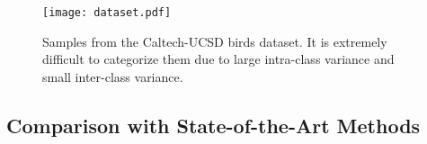 \documentclass{article}
\begin{document}
\begin{figure}[!t]
   \centering
   \texttt{[image: dataset.pdf]} %
   \vspace{-6pt}
   \caption{Samples from the Caltech-UCSD birds dataset. It is extremely difficult to categorize them due to large intra-class variance and small inter-class variance.}
   \vspace{-6pt}
   \label{fig:dataset}
\end{figure}



\subsection{Comparison with State-of-the-Art Methods}
\end{document}
